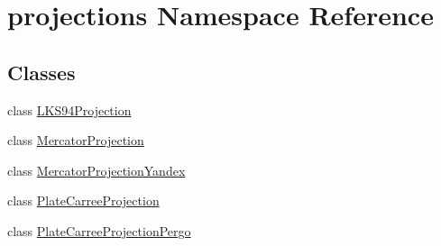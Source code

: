 \hypertarget{namespaceprojections}{\section{projections Namespace Reference}
\label{namespaceprojections}
}
\subsection*{Classes}
\begin{DoxyCompactItemize}
\item 
class \hyperlink{classprojections_1_1_l_k_s94_projection}{L\-K\-S94\-Projection}
\item 
class \hyperlink{classprojections_1_1_mercator_projection}{Mercator\-Projection}
\item 
class \hyperlink{classprojections_1_1_mercator_projection_yandex}{Mercator\-Projection\-Yandex}
\item 
class \hyperlink{classprojections_1_1_plate_carree_projection}{Plate\-Carree\-Projection}
\item 
class \hyperlink{classprojections_1_1_plate_carree_projection_pergo}{Plate\-Carree\-Projection\-Pergo}
\end{DoxyCompactItemize}
